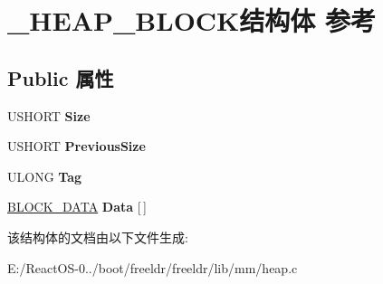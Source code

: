 \hypertarget{struct___h_e_a_p___b_l_o_c_k}{}\section{\+\_\+\+H\+E\+A\+P\+\_\+\+B\+L\+O\+C\+K结构体 参考}
\label{struct___h_e_a_p___b_l_o_c_k}
\subsection*{Public 属性}
\begin{DoxyCompactItemize}
\item 
\mbox{\label{struct___h_e_a_p___b_l_o_c_k_a5f2662263a1000f2b98e3b7822b7082f}} 
U\+S\+H\+O\+RT {\bfseries Size}
\item 
\mbox{\label{struct___h_e_a_p___b_l_o_c_k_a611d7e2fb72dfbd6107ab8e4cebfc001}} 
U\+S\+H\+O\+RT {\bfseries Previous\+Size}
\item 
\mbox{\label{struct___h_e_a_p___b_l_o_c_k_a6012100713e2f7d80fa66660dce4aeca}} 
U\+L\+O\+NG {\bfseries Tag}
\item 
\mbox{\label{struct___h_e_a_p___b_l_o_c_k_afe3132c6a772faecdab779b668495dcc}} 
\hyperlink{struct___b_l_o_c_k___d_a_t_a}{B\+L\+O\+C\+K\+\_\+\+D\+A\+TA} {\bfseries Data} \mbox{[}$\,$\mbox{]}
\end{DoxyCompactItemize}


该结构体的文档由以下文件生成\+:\begin{DoxyCompactItemize}
\item 
E\+:/\+React\+O\+S-\/0../boot/freeldr/freeldr/lib/mm/heap.\+c\end{DoxyCompactItemize}
